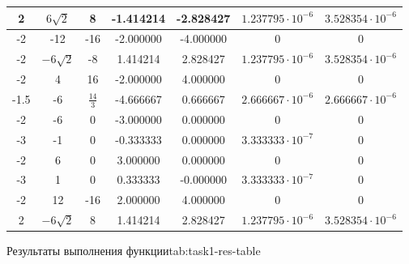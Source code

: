 \documentclass[a4paper, 12pt, oneside]{article}
\begin{document}
{\begin{tabular}{|c|c|c|c|c|c|c|}
            2    & $6\sqrt{2}$  & 8               & -1.414214    & -2.828427    & $1.237795\cdot10^{-6}$ & $3.528354\cdot10^{-6}$ \\
            \hline
            -2   & -12          & -16             & -2.000000    & -4.000000    & 0                      & 0                      \\
            \hline
            -2   & $-6\sqrt{2}$ & -8              & 1.414214     & 2.828427     & $1.237795\cdot10^{-6}$ & $3.528354\cdot10^{-6}$ \\
            \hline
            -2   & 4            & 16              & -2.000000    & 4.000000     & 0                      & 0                      \\
            \hline
            -1.5 & -6           & $\frac{14}{3}$  & -4.666667    & 0.666667     & $2.666667\cdot10^{-6}$ & $2.666667\cdot10^{-6}$ \\
            \hline
            -2   & -6           & 0               & -3.000000    & 0.000000     & 0                      & 0                      \\
            \hline
            -3   & -1           & 0               & -0.333333    & 0.000000     & $3.333333\cdot10^{-7}$ & 0                      \\
            \hline
            -2   & 6            & 0               & 3.000000     & 0.000000     & 0                      & 0                      \\
            \hline
            -3   & 1            & 0               & 0.333333     & -0.000000    & $3.333333\cdot10^{-7}$ & 0                      \\
            \hline
            -2   & 12           & -16             & 2.000000     & 4.000000     & 0                      & 0                      \\
            \hline
            2    & $-6\sqrt{2}$ & 8               & 1.414214     & 2.828427     & $1.237795\cdot10^{-6}$ & $3.528354\cdot10^{-6}$ \\
            \hline
        \end{tabular}
    }{Результаты выполнения функции}{tab:task1-res-table}
\end{document}
